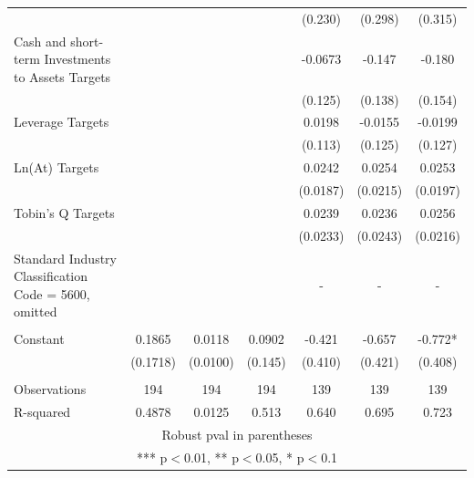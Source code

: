 \documentclass[12pt]{article}
\begin{document}
\begin{table}[ht]
\begin{adjustbox}{height=10cm, max width=\textwidth}
\begin{tabular}{lcccccc}
		&  &  &  & (0.230) & (0.298) & (0.315) \\
	   Cash and short-term Investments to Assets Targets &  &  &  & -0.0673 & -0.147 & -0.180 \\
		&  &  &  & (0.125) & (0.138) & (0.154) \\
	   Leverage Targets &  &  &  & 0.0198 & -0.0155 & -0.0199 \\
		&  &  &  & (0.113) & (0.125) & (0.127) \\
	   Ln(At) Targets &  &  &  & 0.0242 & 0.0254 & 0.0253 \\
		&  &  &  & (0.0187) & (0.0215) & (0.0197) \\
	   Tobin's Q Targets &  &  &  & 0.0239 & 0.0236 & 0.0256 \\
		&  &  &  & (0.0233) & (0.0243) & (0.0216) \\
	   Standard Industry Classification Code = 5600, omitted &  &  &  & - & - & - \\
		&  &  &  &  &  &  \\
	   Constant & 0.1865 & 0.0118 & 0.0902 & -0.421 & -0.657 & -0.772* \\
		& (0.1718) & (0.0100) & (0.145) & (0.410) & (0.421) & (0.408) \\
		&  &  &  &  &  &  \\
	   Observations & 194 & 194 & 194 & 139 & 139 & 139 \\
		R-squared & 0.4878 & 0.0125 & 0.513 & 0.640 & 0.695 & 0.723 \\ \hline
	   \multicolumn{7}{c}{ Robust pval in parentheses} \\
	   \multicolumn{7}{c}{ *** p$<$0.01, ** p$<$0.05, * p$<$0.1} \\
	   \end{tabular}
	\end{adjustbox}
	\end{table}
\end{document}
